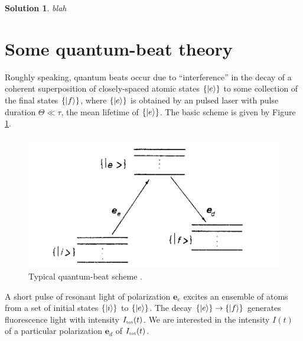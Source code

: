 \documentclass[11pt]{article}
\newtheorem{solution}{Solution}
\begin{document}
\begin{solution}
	blah
\end{solution}






\section{Some quantum-beat theory}

Roughly speaking, quantum beats occur due to ``interference'' in the decay of a coherent superposition of closely-spaced atomic states $\{\ket{{e}}\}$ to some collection of the final states $\{ \ket{{f}}  \}$, where $\{ \ket{{e}}   \}$ is obtained by an pulsed laser with pulse duration $\Theta \ll \tau$, the mean lifetime of $\{ \ket{{e}}   \}$. The basic scheme is given by Figure \ref{fig:energies}.

\begin{figure}[!htb]
	\centering
	\includegraphics[scale=0.7]{energies}
	\caption{Typical quantum-beat scheme \cite{Luypaert_1977}.}
	\label{fig:energies}
\end{figure}


A short pulse of resonant light of polarization $\mathbf{e}_e$ excites an ensemble of atoms from a set of initial states $\{ \ket{i}  \}$ to $\{ \ket{e} \}$. The decay $\{ \ket{e} \} \to\{ \ket{f}  \}$ generates fluorescence light with intensity $I_{\tiny{\mbox{tot}}}(t)$. We are interested in the intensity $I(t)$ of a particular polarization $\mathbf{e}_d$ of $I_{\tiny{\mbox{tot}}}(t)$.  
\end{document}
